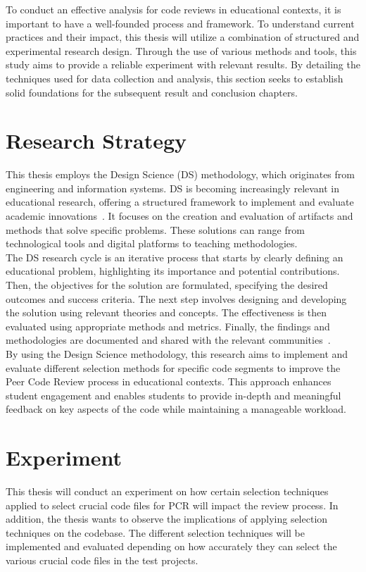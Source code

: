 \label{Methodology}
To conduct an effective analysis for code reviews in educational contexts, it is important to have a well-founded process and framework. To understand current practices and their impact, this thesis will utilize a combination of structured and experimental research design. Through the use of various methods and tools, this study aims to provide a reliable experiment with relevant results. By detailing the techniques used for data collection and analysis, this section seeks to establish solid foundations for the subsequent result and conclusion chapters.

\section{Research Strategy}
This thesis employs the Design Science (DS) methodology, which originates from engineering and information systems. DS is becoming increasingly relevant in educational research, offering a structured framework to implement and evaluate academic innovations~\cite{Design_Science}. It focuses on the creation and evaluation of artifacts and methods that solve specific problems. These solutions can range from technological tools and digital platforms to teaching methodologies. \\

The DS research cycle is an iterative process that starts by clearly defining an educational problem, highlighting its importance and potential contributions. Then, the objectives for the solution are formulated, specifying the desired outcomes and success criteria. The next step involves designing and developing the solution using relevant theories and concepts. The effectiveness is then evaluated using appropriate methods and metrics. Finally, the findings and methodologies are documented and shared with the relevant communities~\cite{Design_Science}. \\

By using the Design Science methodology, this research aims to implement and evaluate different selection methods for specific code segments to improve the Peer Code Review process in educational contexts. This approach enhances student engagement and enables students to provide in-depth and meaningful feedback on key aspects of the code while maintaining a manageable workload. \\


\section{Experiment}
This thesis will conduct an experiment on how certain selection techniques applied to select crucial code files for PCR will impact the review process. In addition, the thesis wants to observe the implications of applying selection techniques on the codebase. The different selection techniques will be implemented and evaluated depending on how accurately they can select the various crucial code files in the test projects. 


